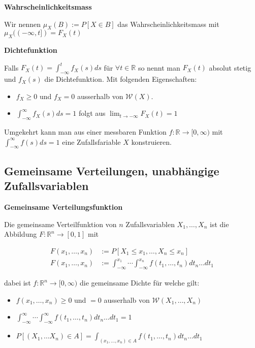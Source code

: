 \documentclass[25pt]{sciposter}
\newcommand{\R}{\mathbb{R}}
\newcommand{\W}{\mathcal{W}}
\newenvironment{method}[1]{\begin{mdframed}[backgroundcolor=blue!10,innertopmargin=15pt, innerbottommargin=15pt,nobreak=true]
		\textbf{#1 }
	}
	{ 
	\end{mdframed}
}
\begin{document}
\begin{multicols}{3}
		
		\begin{method}{Wahrscheinlichkeitsmass}
			Wir nennen $\mu_X(B) := P[X \in B]$ das Wahrscheinlichkeitsmass mit $\mu_X((-\infty,t]) = F_X(t)$
		\end{method}
		
		\begin{method}{Dichtefunktion}
			Falls $F_X(t) = \int_{-\infty}^t f_X(s) ds$ für $\forall t\in\R$ so nennt man $F_X(t)$ absolut stetig und $f_X(s)$ die Dichtefunktion. Mit folgenden Eigenschaften:
			\begin{itemize}
				\item $f_X \geq 0$ und $f_X = 0$ ausserhalb von $\W(X)$.
				\item $\int_{-\infty}^\infty f_X(s) ds = 1$ folgt aus $\lim_{t \to -\infty}F_X(t) = 1$
			\end{itemize}
			
			Umgekehrt kann man aus einer messbaren Funktion $f:\R\to[0,\infty)$ mit $\int_{-\infty}^\infty f(s)ds = 1$ eine Zufallsfariable $X$ konstruieren.
		\end{method}
		
		
		
		\subsection*{Gemeinsame Verteilungen, unabhängige Zufallsvariablen}
		
		
		\begin{method}{Gemeinsame Verteilungsfunktion}
			Die gemeinsame Verteilfunktion von $n$ Zufallsvariablen $X_1,\ldots, X_n$ ist die Abbildung $F:\R^n \to [0,1]$ mit
			
			\begin{align*}
				F(x_1,\ldots,x_n) &:= P[X_1 \leq x_1, \ldots , X_n \leq x_n]\\
				F(x_1,\ldots,x_n) &:= \int_{-\infty}^{x_1}\cdots \int_{-\infty}^{x_n}f(t_1,\ldots,t_n)dt_n\ldots dt_1
			\end{align*}
			
			dabei ist $f:\R^n \to [0,\infty)$ die gemeinsame Dichte für welche gilt:
			\begin{itemize}
				\item $f(x_1,\ldots,x_n)\geq 0$ und $=0$ ausserhalb von $\W(X_1,\ldots,X_n)$
				\item $\int_{-\infty}^{\infty}\cdots \int_{-\infty}^{\infty}f(t_1,\ldots,t_n)dt_n\ldots dt_1 = 1$
				\item $P[(X_1,\ldots X_n)\in A] = \int_{(x_1,\ldots,x_n)\in A}f(t_1,\ldots,t_n)dt_n\ldots dt_1$
			\end{itemize} 
		\end{method}
		

\end{multicols}
\end{document}
